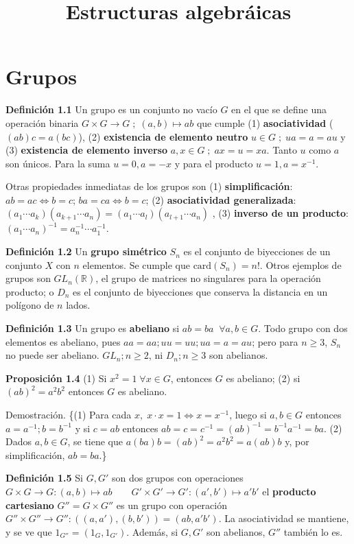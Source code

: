 \documentclass[a4paper, 11pt]{extarticle}
\date{}
\title{\Huge\vspace{-1em}Estructuras algebráicas}
\newcommand{\propo}[1]{\textcolor{rojo}{\textbf{Proposición #1}}}
\newcommand{\defi}[1]{\textcolor{azul}{\textbf{Definición #1}}}
\newcommand{\dem}[1]{\textcolor{gris}{\small{Demostración. {#1}}}}
\begin{document}
\maketitle
\vspace{-8em}

\section{Grupos}
\label{sec:org1041499}
\defi{1.1} Un grupo es un conjunto no vacío \(G\) en el que se define una 
operación binaria \(G \times G \rightarrow G\;;\; (a,b) \mapsto ab\) que cumple (1) \textbf{asociatividad}
(\((ab)c = a(bc)\)), (2) \textbf{existencia de elemento neutro} \(u \in G\;;\;ua=a=au\)
y (3) \textbf{existencia de elemento inverso} \(a,x \in G \;;\; ax = u = xa\). Tanto \(u\) como \(a\) 
son únicos. Para la suma \(u = 0, a=-x\) y para el producto \(u = 1, a = x^{-1}\).

Otras propiedades inmediatas de los grupos son (1) \textbf{simplificación}: \(ab=ac \iff b=c\); \(ba = ca \iff b=c\); (2) \textbf{asociatividad generalizada}: \((a_1 \cdots a_k)(a_{k+1} \cdots a_n ) =
(a_1 \cdots a_l)(a_{l+1} \cdots a_n)\) 
, (3) \textbf{inverso de un producto}: \((a_1 \cdots a_n)^{-1}  = a_n^{-1} \cdots
a_1^{-1}\).

\defi{1.2} Un \textbf{grupo simétrico} \(S_n\) es el conjunto de biyecciones de un
conjunto \(X\) con \(n\) elementos. Se cumple que \(\text{card}(S_n) = n!\). Otros ejemplos de 
grupos son \(GL_n(\mathbb{R})\), el grupo de matrices no
singulares para la operación producto; o \(D_n\) es el conjunto de biyecciones
que conserva la distancia en un polígono de \(n\) lados. 

\defi{1.3} Un grupo es \textbf{abeliano} si \(ab = ba\;\; \forall a,b \in G\).
Todo grupo con dos elementos es abeliano, pues \(aa = aa; uu=uu; ua=a=au\);
pero para \(n \ge 3\), \(S_n\) no puede ser abeliano. \(GL_n; n \ge 2\),
ni \(D_n; n \ge 3\) son abelianos.

\propo{1.4} (1) Si \(x^2 = 1 \; \forall x \in G\), entonces \(G\) es
abeliano; (2) si \((ab)^2=a^2b^2\) entonces \(G\) es abeliano.

\dem\{(1) Para cada \(x,\; x \cdot x = 1 \iff x = x^{-1}\), luego si \(a,b \in G\) 
entonces \(a = a^{-1}; b=b^{-1}\) y si \(c = ab\) entonces 
\(ab = c =c^{-1} = (ab)^{-1} = b^{-1}a^{-1} = ba\). (2) Dados \(a,b \in G\), 
se tiene que \(a(ba)b = (ab)^2 = a^2b^2 = a(ab)b\) y, por simplificación,
 \(ab = ba\).\} 

\defi{1.5} Si \(G,G'\) son dos grupos con operaciones
\(G \times G \rightarrow G: (a,b) \mapsto ab \qquad G' \times G' \rightarrow G': (a', b') \mapsto a'b'\)
 el \textbf{producto cartesiano} \(G'' = G \times G''\) es un grupo con operación 
\(G'' \times G'' \rightarrow G'': ((a, a'), (b, b')) = (ab, a'b')\). La asociatividad se mantiene, y se ve que \(1_{G''} = (1_G, 1_{G'})\).
Además, si \(G, G'\) son abelianos, \(G''\) también lo es.
\end{document}
